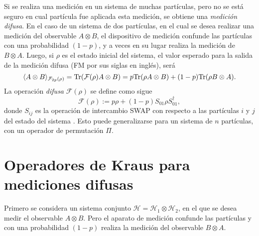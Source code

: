 Si se  realiza una  medición en un sistema de muchas partículas, pero no se
está seguro en cual partícula  fue aplicada esta medición, se obtiene una
\textit{medición difusa}. En el caso de un sistema de dos partículas, en el cual se desea realizar una medición del observable $A\otimes B$, el dispositivo de medición confunde las partículas con una probabilidad $(1-p)$, y a veces en su lugar realiza la medición de $B\otimes A$. Luego, si $\rho$ es el estado
inicial del sistema, el valor esperado para la salida de la medición difusa (FM
por sus siglas en inglés), será 
\begin{equation}\label{ExpectedValue-theorginal}
    \langle A\otimes B\rangle_{\mathcal{F}_{2p}(\rho)}={\rm Tr}(\mathcal{F}(\rho)A\otimes B)=p{\rm Tr}(\rho A\otimes B)+(1-p){\rm Tr}(\rho B\otimes A).
\end{equation}
La operación \textit{difusa }$\mathcal{F}(\rho)$ se define como sigue 
\begin{equation}\label{eq:operador_difuso2p}
    \mathcal{F}(\rho):=p\rho+(1-p)S_{01}\rho S_{01}^\dagger,
\end{equation}
donde $S_{ij}$ es la operación de intercambio SWAP con respecto a las
partículas $i$ y $j$ del estado del sistema {\cite{Pineda_2021}}. Esto puede
generalizarse para un sistema de $n$ partículas, con un operador de permutación
$\Pi$.

 \section{Operadores de Kraus para mediciones difusas} %

 Primero se considera un sistema conjunto $\mathcal{H}=\mathcal{H}_1\otimes
\mathcal{H}_2$, en el que se desea medir el observable $A\otimes B$. Pero el
aparato de medición confunde las partículas y con una probabilidad $(1-p) $
realiza la medición del observable $B\otimes A$. 

   




